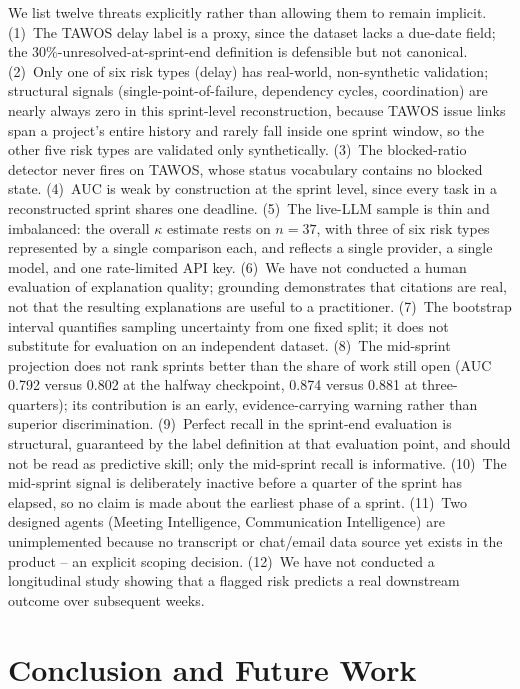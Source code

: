 \documentclass[conference]{IEEEtran}
\begin{document}
We list twelve threats explicitly rather than allowing them to remain implicit.
(1)~The TAWOS delay label is a proxy, since the dataset lacks a due-date field; the
30\%-unresolved-at-sprint-end definition is defensible but not canonical.
(2)~Only one of six risk types (delay) has real-world, non-synthetic validation;
structural signals (single-point-of-failure, dependency cycles, coordination) are
nearly always zero in this sprint-level reconstruction, because TAWOS issue links
span a project's entire history and rarely fall inside one sprint window, so the
other five risk types are validated only synthetically. (3)~The blocked-ratio
detector never fires on TAWOS, whose status vocabulary contains no blocked state.
(4)~AUC is weak by construction at the sprint level, since every task in a
reconstructed sprint shares one deadline. (5)~The live-LLM sample is thin and
imbalanced: the overall $\kappa$ estimate rests on $n=37$, with three of six risk
types represented by a single comparison each, and reflects a single provider, a
single model, and one rate-limited API key. (6)~We have not conducted a human
evaluation of explanation quality; grounding demonstrates that citations are real,
not that the resulting explanations are useful to a practitioner. (7)~The bootstrap
interval quantifies sampling uncertainty from one fixed split; it does not
substitute for evaluation on an independent dataset. (8)~The mid-sprint projection
does not rank sprints better than the share of work still open (AUC 0.792 versus
0.802 at the halfway checkpoint, 0.874 versus 0.881 at three-quarters); its
contribution is an early, evidence-carrying warning rather than superior
discrimination. (9)~Perfect recall in the sprint-end evaluation is structural,
guaranteed by the label definition at that evaluation point, and should not be read
as predictive skill; only the mid-sprint recall is informative. (10)~The mid-sprint
signal is deliberately inactive before a quarter of the sprint has elapsed, so no
claim is made about the earliest phase of a sprint. (11)~Two designed agents (Meeting
Intelligence, Communication Intelligence) are unimplemented because no transcript or
chat/email data source yet exists in the product -- an explicit scoping decision.
(12)~We have not conducted a longitudinal study showing that a flagged risk predicts
a real downstream outcome over subsequent weeks.

\section{Conclusion and Future Work}
\end{document}

